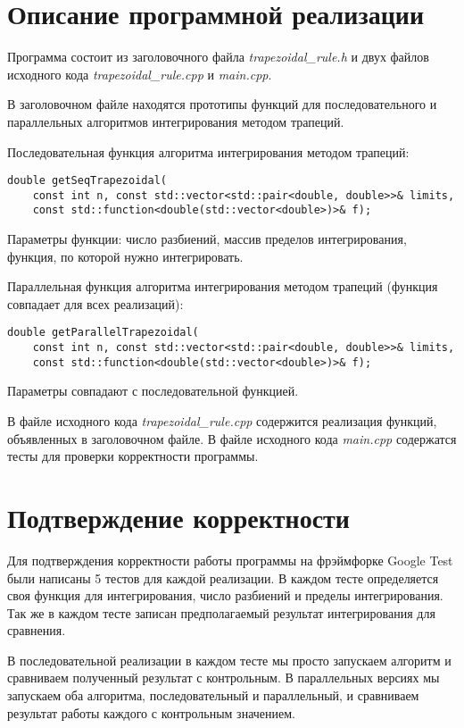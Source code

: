 \documentclass{report}
\begin{document}
\section*{Описание программной реализации}
Программа состоит из заголовочного файла \emph{trapezoidal\_rule.h} и двух файлов исходного кода \emph{trapezoidal\_rule.cpp} и \emph{main.cpp}.
\par В заголовочном файле находятся прототипы функций для последовательного и параллельных алгоритмов интегрирования методом трапеций.

\par Последовательная функция алгоритма интегрирования методом трапеций:
\begin{lstlisting}
double getSeqTrapezoidal(
    const int n, const std::vector<std::pair<double, double>>& limits,
    const std::function<double(std::vector<double>)>& f);
\end{lstlisting}
Параметры функции: число разбиений, массив пределов интегрирования, функция, по которой нужно интегрировать.

\par Параллельная функция алгоритма интегрирования методом трапеций (функция совпадает для всех реализаций):
\begin{lstlisting}
double getParallelTrapezoidal(
    const int n, const std::vector<std::pair<double, double>>& limits,
    const std::function<double(std::vector<double>)>& f);
\end{lstlisting}
Параметры совпадают с последовательной функцией.

\par В файле исходного кода \emph{trapezoidal\_rule.cpp} содержится реализация функций, объявленных в заголовочном файле. В файле исходного кода \emph{main.cpp} содержатся тесты для проверки корректности программы.
\newpage

\section*{Подтверждение корректности}
\par Для подтверждения корректности работы программы на фрэймфорке Google Test были написаны 5 тестов для каждой реализации. В каждом тесте определяется своя функция для интегрирования, число разбиений и пределы интегрирования. Так же в каждом тесте записан предполагаемый результат интегрирования для сравнения.
\par В последовательной реализации в каждом тесте мы просто запускаем алгоритм и сравниваем полученный результат с контрольным. В параллельных версиях мы запускаем оба алгоритма, последовательный и параллельный, и сравниваем результат работы каждого с контрольным значением.
\newpage
\end{document}
